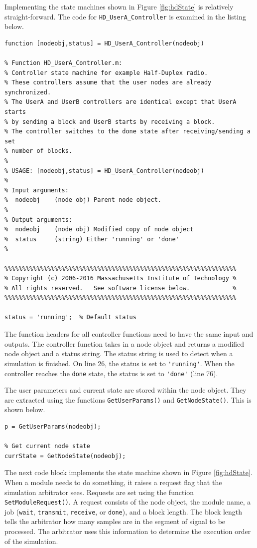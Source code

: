 Implementing the state machines shown in Figure \ref{fig:hdState} is
relatively straight-forward.  The code for
\verb+HD_UserA_Controller+ is examined in the listing below.

\begin{lstlisting}[name=hdState]
function [nodeobj,status] = HD_UserA_Controller(nodeobj)

% Function HD_UserA_Controller.m:
% Controller state machine for example Half-Duplex radio.
% These controllers assume that the user nodes are already synchronized.
% The UserA and UserB controllers are identical except that UserA starts
% by sending a block and UserB starts by receiving a block.
% The controller switches to the done state after receiving/sending a set
% number of blocks.
%
% USAGE: [nodeobj,status] = HD_UserA_Controller(nodeobj)
%
% Input arguments:
%  nodeobj    (node obj) Parent node object.
%
% Output arguments:
%  nodeobj    (node obj) Modified copy of node object
%  status     (string) Either 'running' or 'done'
%

%%%%%%%%%%%%%%%%%%%%%%%%%%%%%%%%%%%%%%%%%%%%%%%%%%%%%%%%%%%%%%%%%
% Copyright (c) 2006-2016 Massachusetts Institute of Technology %
% All rights reserved.   See software license below.            %
%%%%%%%%%%%%%%%%%%%%%%%%%%%%%%%%%%%%%%%%%%%%%%%%%%%%%%%%%%%%%%%%%

status = 'running';  % Default status

\end{lstlisting}

The function headers for all controller functions need to have the
same input and outputs.  The controller function takes in a node
object and returns a modified node object and a status string.  The
status string is used to detect when a simulation is finished.  On
line 26, the status is set to \verb+'running'+.  When the controller
reaches the \verb+done+ state, the status is set to \verb+'done'+
(line 76).

The user parameters and current state are stored within the node
object.  They are extracted using the functions
\verb+GetUserParams()+ and \verb+GetNodeState()+.  This is shown
below.

\begin{lstlisting}[name=hdState]
% Load user parameters
p = GetUserParams(nodeobj);

% Get current node state
currState = GetNodeState(nodeobj);

\end{lstlisting}

The next code block implements the state machine shown in Figure
\ref{fig:hdState}.  When a module needs to do something, it raises a
request flag that the simulation arbitrator sees.  Requests are set
using the function \verb+SetModuleRequest()+.  A request consists of
the node object, the module name, a job (\verb+wait+,
\verb+transmit+, \verb+receive+, or \verb+done+), and a block
length. The block length tells the arbitrator how many samples are
in the segment of signal to be processed.  The arbitrator uses this
information to determine the execution order of the simulation.

